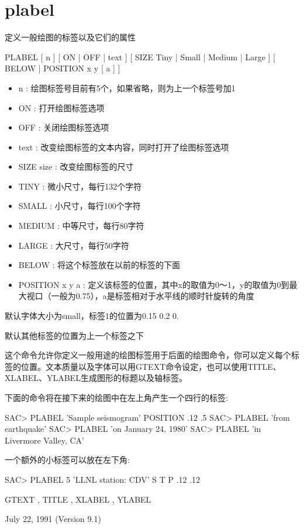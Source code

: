 \section{plabel}
\label{cmd:plabel}

定义一般绘图的标签以及它们的属性

PLABEL [ n ] [ ON | OFF | text ] [ SIZE Tiny | Small | Medium | Large ] [ BELOW | POSITION x y [ a ] ]

\begin{itemize}
\item n : 绘图标签号目前有5个，如果省略，则为上一个标签号加1
\item ON : 打开绘图标签选项 
\item OFF : 关闭绘图标签选项 
\item text : 改变绘图标签的文本内容，同时打开了绘图标签选项 
\item SIZE size :  改变绘图标签的尺寸 
\item TINY : 微小尺寸，每行132个字符 
\item SMALL :  小尺寸，每行100个字符 
\item MEDIUM : 中等尺寸，每行80字符 
\item LARGE : 大尺寸，每行50字符 
\item BELOW : 将这个标签放在以前的标签的下面 
\item POSITION x y a : 定义该标签的位置，其中x的取值为0～1，y的取值为0到最大视口（一般为0.75），a是标签相对于水平线的顺时针旋转的角度
\end{itemize}

默认字体大小为small，标签1的位置为0.15 0.2 0. 
 
默认其他标签的位置为上一个标签之下

这个命令允许你定义一般用途的绘图标签用于后面的绘图命令，你可以定义每个标签的位置。文本质量以及字体可以用GTEXT命令设定，也可以使用TITLE、XLABEL、YLABEL生成图形的标题以及轴标签。

下面的命令将在接下来的绘图中在左上角产生一个四行的标签:
\begin{SACCode}
SAC> PLABEL 'Sample seismogram' POSITION .12 .5
SAC> PLABEL 'from earthquake'
SAC> PLABEL 'on January 24, 1980'
SAC> PLABEL 'in Livermore Valley, CA'
\end{SACCode}

一个额外的小标签可以放在左下角:
\begin{SACCode}
SAC> PLABEL 5 'LLNL station: CDV' S T P .12 .12
\end{SACCode}

GTEXT , TITLE , XLABEL , YLABEL

July 22, 1991 (Version 9.1)
